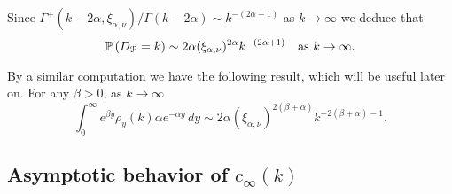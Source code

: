 Since $\Gamma^{+}(k-2\alpha, \xi_{\alpha,\nu})/\Gamma(k - 2\alpha) \sim k^{-(2\alpha+1)}$ as $k \to \infty$  we deduce that
\begin{equation}\label{eq:degree_distribution_P_asymptotics}
	\mathbb{P}\left(D_{{\mathcal P}} = k\right) \sim 2\alpha (\xi_{\alpha,\nu})^{2\alpha} k^{-(2\alpha + 1)}
	\quad \text{as } k \to \infty.
\end{equation}

By a similar computation we have the following result, which will be useful later on. For any $\beta > 0$, as $k \to \infty$
\begin{equation}\label{eq:general_integral_rho_y_k}
	\int_0^\infty e^{\beta y} \rho_y(k) \alpha e^{-\alpha y} \, dy
    \sim 2\alpha \left(\xi_{\alpha,\nu}\right)^{2(\beta + \alpha)} k^{-2(\beta + \alpha)-1}.
\end{equation}

\subsection{Asymptotic behavior of $c_\infty(k)$}\label{ssec:asymptotics_local_clustering_P}

%

